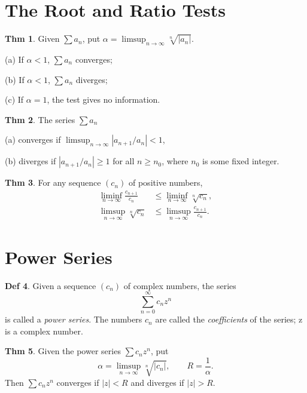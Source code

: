 \documentclass{article}
\theoremstyle{definition}
\newtheorem{definition}{Def}
\newtheorem{theorem}[definition]{Thm}
\begin{document}
\section{The Root and Ratio Tests}
\begin{theorem}
    Given $\sum a_n$, put $\alpha=\limsup_{n\to\infty}\sqrt[n]{|a_n|}$.\par
    (a) If $\alpha<1$, $\sum a_n$ converges;\par
    (b) If $\alpha<1$, $\sum a_n$ diverges;\par
    (c) If $\alpha=1$, the test gives no information.
\end{theorem}
\begin{theorem}
    The series $\sum a_n$\par
    (a) converges if $\limsup_{n\to\infty}|a_{n+1}/a_n|<1$,\par
    (b) diverges if $|a_{n+1}/a_n|\geq1$ for all $n\geq n_0$, where $n_0$ is some fixed integer.
\end{theorem}
\begin{theorem}
    For any sequence $(c_n)$ of positive numbers,
    \[
    \begin{aligned}
        \liminf_{n\to\infty}\frac{c_{n+1}}{c_n} &\leq \liminf_{n\to\infty} \sqrt[n]{c_n},\\
        \limsup_{n\to\infty}\sqrt[n]{c_n} &\leq \limsup_{n\to\infty} \frac{c_{n+1}}{c_n}.
    \end{aligned}
    \]
\end{theorem}

\section{Power Series}
\begin{definition}
    Given a sequence $(c_n)$ of complex numbers, the series
    \[
    \sum_{n=0}^\infty c_n z^n
    \]
    is called a \textit{power series}. The numbers $c_n$ are called the \textit{coefficients} of the series; z is a complex number.
\end{definition}
\begin{theorem}
    Given the power series $\sum c_n z^n$, put
    \[
    \alpha=\limsup_{n\to\infty} \sqrt[n]{|c_n|}, \qquad R=\frac{1}{\alpha}.
    \]
    Then $\sum c_n z^n$ converges if $|z|<R$ and diverges if $|z|>R$.
\end{theorem}
\end{document}
